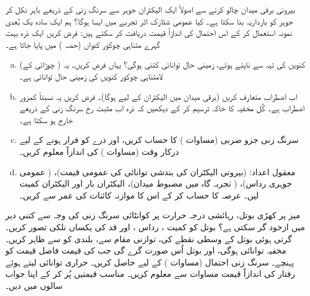  بیرونی برقی میدان چالو کرنے سے اصولاً ایک الیکٹران جوہر سے سرنگ زنی کے ذریعے باہر نکل کر جوہر کو بارداریہ بنا سکتا ہے۔  کیا عمومی شٹارک اثر تجربے میں ایسا ہوگا؟ ہم ایک سادہ یک بُعدی نمونہ استعمال کر کے اس احتمال کی اندازاً قیمت دریافت کر سکتے ہیں: فرض کریں ایک ذرہ بہت گہرے متناہی چوکور کنواں (حصہ ) میں پایا جاتا ہے۔
\begin{enumerate}[a.]
\item
 کنویں کی تہہ سے ناپتے ہوئے، زمینی حال توانائی کتنی ہوگی؟ یہاں  فرض کریں۔  یہ (  چوڑائی کے) لامتناہی چوکور کنویں کی زمینی حال توانائی ہے۔
\item
 اب اضطراب  متعارف کریں (برقی میدان  میں الیکٹران کے لیے  ہوگا)۔ فرض کریں یہ نسبتاً کمزور اضطراب  ہے۔ کُل مخفیہ کا خاکہ ترسیم کر کے دیکھیں کہ ذرہ اب مثبت  رخ سرنگ زنی کے ذریعے خارج ہو سکتا ہے۔
\item
 سرنگ زنی جزو ضربی  (مساوات ) کا حساب کریں، اور ذرے کو فرار ہونے کے لیے درکار وقت (مساوات ) کی اندازاً معلوم کریں۔  
\item
 معقول اعداد:  (بیرونی الیکٹران کی بندشی توانائی کی عمومی قیمت)،  ( عمومی جوہری رداس)،  ( تجربہ گاہ میں مضبوط میدان)، الیکٹران بار  اور الیکٹران کمیت  لیں۔ عرصہ  کا حساب کر کے اس کا موازنہ کائنات کی عمر سے کریں۔
 \end{enumerate}
میز پر کھڑی بوتل، رہائشی درجہ حرارت پر کوانٹائی سرنگ زنی کی وجہ سے کتنی دیر میں ازخود گر سکتی ہے؟  بوتل کو کمیت ، رداس ، اور قد  کی یکساں نلکی تصور کریں۔ گرتی ہوئی بوتل کے وسطی نقطے کی، توازنی مقام  سے، بلندی کو  سے ظاہر کریں۔ مخفیہ توانائی  ہوگی، اور بوتل اُس صورت گرے گی جب  کی قیمت فاصل قیمت  کو پہنچے۔ سرنگ زنی احتمال (مساوات )  کے لیے حاصل کریں۔ حراری توانائی  لیتے ہوئے رفتار کی اندازاً قیمت مساوات  سے معلوم کریں۔ مناسب قیمتیں پُر کر کے اپنا جواب سالوں میں دیں۔

